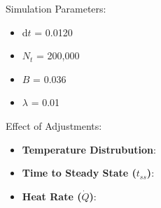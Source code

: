 \documentclass{article}
\begin{document}
Simulation Parameters:
\begin{itemize}
    \item d$t$ = 0.0120
    \item $N_t$ = 200,000
    \item $B$ = 0.036
    \item $\lambda$ = 0.01
\end{itemize}

Effect of Adjustments:
\begin{itemize}
    \item \textbf{Temperature Distrubution}:
    \item \textbf{Time to Steady State ($t_{ss}$)}:
    \item \textbf{Heat Rate ($\dot{Q}$)}:
\end{itemize}
\end{document}
